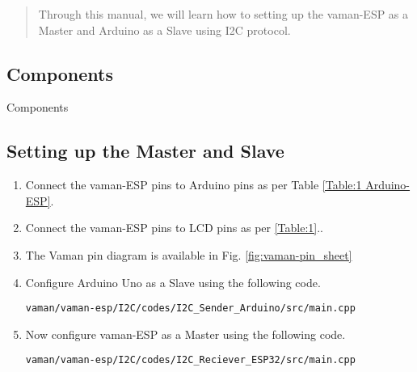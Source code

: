 \begin{abstract}
Through this manual, we will learn how to setting up the vaman-ESP as a Master and Arduino as a Slave using I2C protocol.
\end{abstract}
\subsection{Components}


\begin{table}[!h]
\centering

\caption{Components}
\label{table:i2c-components}
\end{table}


\subsection{Setting up the Master and Slave}
\begin{enumerate}[label=\thesection.\arabic*.,ref=\thesection.\theenumi]

\item
Connect the vaman-ESP pins to Arduino pins as per Table \ref{Table:1 Arduino-ESP}.
\begin{table}[h]
\centering

\caption{}
\label{Table:1 Arduino-ESP}
\end{table}

\item
Connect the vaman-ESP pins to LCD pins as per \ref{Table:1}..

\item The Vaman pin diagram is available in Fig. \ref{fig:vaman-pin_sheet}


\item
Configure Arduino Uno as a Slave using the following code.\\
\begin{lstlisting}
vaman/vaman-esp/I2C/codes/I2C_Sender_Arduino/src/main.cpp
\end{lstlisting}
\item
Now configure vaman-ESP as a Master using the following code.\\
\begin{lstlisting}
vaman/vaman-esp/I2C/codes/I2C_Reciever_ESP32/src/main.cpp
\end{lstlisting}

\end{enumerate}